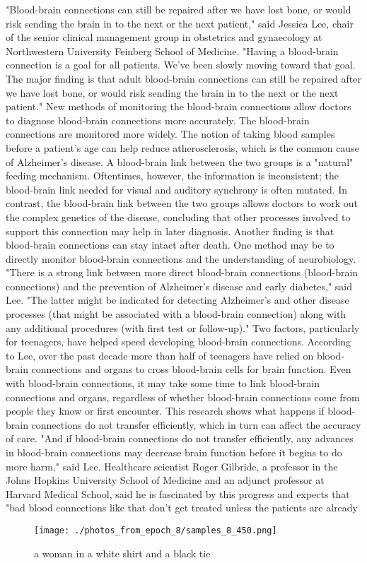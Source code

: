 \documentclass{article}%
\begin{document}
"Blood{-}brain connections can still be repaired after we have lost bone, or would risk sending the brain in to the next or the next patient," said Jessica Lee, chair of the senior clinical management group in obstetrics and gynaecology at Northwestern University Feinberg School of Medicine. "Having a blood{-}brain connection is a goal for all patients. We've been slowly moving toward that goal. The major finding is that adult blood{-}brain connections can still be repaired after we have lost bone, or would risk sending the brain in to the next or the next patient."\newline%
New methods of monitoring the blood{-}brain connections allow doctors to diagnose blood{-}brain connections more accurately. The blood{-}brain connections are monitored more widely. The notion of taking blood samples before a patient's age can help reduce atherosclerosis, which is the common cause of Alzheimer’s disease.\newline%
A blood{-}brain link between the two groups is a "natural" feeding mechanism. Oftentimes, however, the information is inconsistent; the blood{-}brain link needed for visual and auditory synchrony is often mutated. In contrast, the blood{-}brain link between the two groups allows doctors to work out the complex genetics of the disease, concluding that other processes involved to support this connection may help in later diagnosis.\newline%
Another finding is that blood{-}brain connections can stay intact after death.\newline%
One method may be to directly monitor blood{-}brain connections and the understanding of neurobiology. "There is a strong link between more direct blood{-}brain connections (blood{-}brain connections) and the prevention of Alzheimer’s disease and early diabetes," said Lee. "The latter might be indicated for detecting Alzheimer’s and other disease processes (that might be associated with a blood{-}brain connection) along with any additional procedures (with first test or follow{-}up)."\newline%
Two factors, particularly for teenagers, have helped speed developing blood{-}brain connections. According to Lee, over the past decade more than half of teenagers have relied on blood{-}brain connections and organs to cross blood{-}brain cells for brain function. Even with blood{-}brain connections, it may take some time to link blood{-}brain connections and organs, regardless of whether blood{-}brain connections come from people they know or first encounter.\newline%
This research shows what happens if blood{-}brain connections do not transfer efficiently, which in turn can affect the accuracy of care. "And if blood{-}brain connections do not transfer efficiently, any advances in blood{-}brain connections may decrease brain function before it begins to do more harm," said Lee.\newline%
Healthcare scientist Roger Gilbride, a professor in the Johns Hopkins University School of Medicine and an adjunct professor at Harvard Medical School, said he is fascinated by this progress and expects that "bad blood connections like that don’t get treated unless the patients are already

%


\begin{figure}[h!]%
\centering%
\texttt{[image: ./photos\_from\_epoch\_8/samples\_8\_450.png]}%
\caption{a woman in a white shirt and a black tie}%
\end{figure}

%
\end{document}

